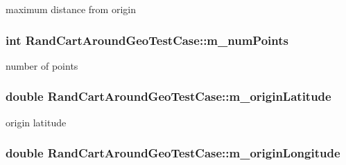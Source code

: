 maximum distance from origin 

\subsubsection[{\texorpdfstring{m\+\_\+num\+Points}{m_numPoints}}]{\setlength{\rightskip}{0pt plus 5cm}int Rand\+Cart\+Around\+Geo\+Test\+Case\+::m\+\_\+num\+Points\hspace{0.3cm}{\ttfamily [private]}}\hypertarget{classRandCartAroundGeoTestCase_ace34f05b40c38d96be98ab93a3dc208e}{}\label{classRandCartAroundGeoTestCase_ace34f05b40c38d96be98ab93a3dc208e}


number of points 

\subsubsection[{\texorpdfstring{m\+\_\+origin\+Latitude}{m_originLatitude}}]{\setlength{\rightskip}{0pt plus 5cm}double Rand\+Cart\+Around\+Geo\+Test\+Case\+::m\+\_\+origin\+Latitude\hspace{0.3cm}{\ttfamily [private]}}\hypertarget{classRandCartAroundGeoTestCase_a7eba973790d9c9df10e57feaf288507e}{}\label{classRandCartAroundGeoTestCase_a7eba973790d9c9df10e57feaf288507e}


origin latitude 

\subsubsection[{\texorpdfstring{m\+\_\+origin\+Longitude}{m_originLongitude}}]{\setlength{\rightskip}{0pt plus 5cm}double Rand\+Cart\+Around\+Geo\+Test\+Case\+::m\+\_\+origin\+Longitude\hspace{0.3cm}{\ttfamily [private]}}\hypertarget{classRandCartAroundGeoTestCase_a6d23cde2f19aba3a4487d991823fb963}{}\label{classRandCartAroundGeoTestCase_a6d23cde2f19aba3a4487d991823fb963}


